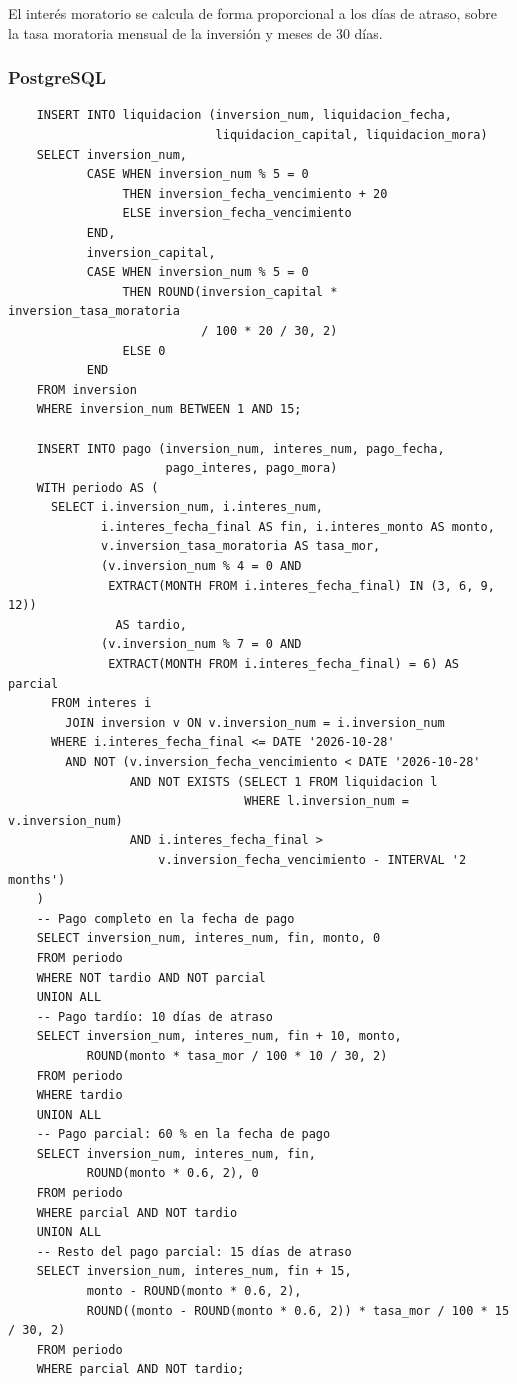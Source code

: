 El interés moratorio se calcula de forma proporcional a los días de atraso, sobre la tasa moratoria mensual de la inversión y meses de 30 días.

\subsubsection{PostgreSQL}

\begin{verbatim}
	INSERT INTO liquidacion (inversion_num, liquidacion_fecha,
	                         liquidacion_capital, liquidacion_mora)
	SELECT inversion_num,
	       CASE WHEN inversion_num % 5 = 0
	            THEN inversion_fecha_vencimiento + 20
	            ELSE inversion_fecha_vencimiento
	       END,
	       inversion_capital,
	       CASE WHEN inversion_num % 5 = 0
	            THEN ROUND(inversion_capital * inversion_tasa_moratoria
	                       / 100 * 20 / 30, 2)
	            ELSE 0
	       END
	FROM inversion
	WHERE inversion_num BETWEEN 1 AND 15;

	INSERT INTO pago (inversion_num, interes_num, pago_fecha,
	                  pago_interes, pago_mora)
	WITH periodo AS (
	  SELECT i.inversion_num, i.interes_num,
	         i.interes_fecha_final AS fin, i.interes_monto AS monto,
	         v.inversion_tasa_moratoria AS tasa_mor,
	         (v.inversion_num % 4 = 0 AND
	          EXTRACT(MONTH FROM i.interes_fecha_final) IN (3, 6, 9, 12))
	           AS tardio,
	         (v.inversion_num % 7 = 0 AND
	          EXTRACT(MONTH FROM i.interes_fecha_final) = 6) AS parcial
	  FROM interes i
	    JOIN inversion v ON v.inversion_num = i.inversion_num
	  WHERE i.interes_fecha_final <= DATE '2026-10-28'
	    AND NOT (v.inversion_fecha_vencimiento < DATE '2026-10-28'
	             AND NOT EXISTS (SELECT 1 FROM liquidacion l
	                             WHERE l.inversion_num = v.inversion_num)
	             AND i.interes_fecha_final >
	                 v.inversion_fecha_vencimiento - INTERVAL '2 months')
	)
	-- Pago completo en la fecha de pago
	SELECT inversion_num, interes_num, fin, monto, 0
	FROM periodo
	WHERE NOT tardio AND NOT parcial
	UNION ALL
	-- Pago tardío: 10 días de atraso
	SELECT inversion_num, interes_num, fin + 10, monto,
	       ROUND(monto * tasa_mor / 100 * 10 / 30, 2)
	FROM periodo
	WHERE tardio
	UNION ALL
	-- Pago parcial: 60 % en la fecha de pago
	SELECT inversion_num, interes_num, fin,
	       ROUND(monto * 0.6, 2), 0
	FROM periodo
	WHERE parcial AND NOT tardio
	UNION ALL
	-- Resto del pago parcial: 15 días de atraso
	SELECT inversion_num, interes_num, fin + 15,
	       monto - ROUND(monto * 0.6, 2),
	       ROUND((monto - ROUND(monto * 0.6, 2)) * tasa_mor / 100 * 15 / 30, 2)
	FROM periodo
	WHERE parcial AND NOT tardio;
\end{verbatim}

